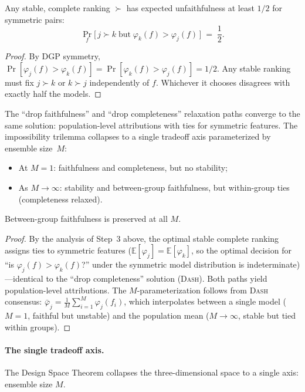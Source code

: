 \documentclass{jmlr}
\newcommand{\E}{\mathbb{E}}
\newcommand{\DASH}{\textsc{Dash}}
\begin{document}
\begin{theorem}
\label{thm:unfaithfulness-bound}
Any stable, complete ranking $\succ$ has expected unfaithfulness at least $1/2$ for symmetric pairs:
\[
    \Pr_f\bigl[\, j \succ k \;\text{but}\; \varphi_k(f) > \varphi_j(f) \,\bigr] \;=\; \frac{1}{2}.
\]
\end{theorem}

\begin{proof}
By DGP symmetry, $\Pr[\varphi_j(f) > \varphi_k(f)] = \Pr[\varphi_k(f) > \varphi_j(f)] = 1/2$. Any stable ranking must fix $j \succ k$ or $k \succ j$ independently of $f$. Whichever it chooses disagrees with exactly half the models.
\end{proof}

\begin{theorem}
\label{thm:path-convergence}
The ``drop faithfulness'' and ``drop completeness'' relaxation paths converge to the same solution: population-level attributions with ties for symmetric features. The impossibility trilemma collapses to a single tradeoff axis parameterized by ensemble size~$M$:
\begin{itemize}
    \item At $M = 1$: faithfulness and completeness, but no stability;
    \item As $M \to \infty$: stability and between-group faithfulness, but within-group ties (completeness relaxed).
\end{itemize}
Between-group faithfulness is preserved at all $M$.
\end{theorem}

\begin{proof}
By the analysis of Step~3 above, the optimal stable complete ranking assigns ties to symmetric features ($\E[\varphi_j] = \E[\varphi_k]$, so the optimal decision for ``is $\varphi_j(f) > \varphi_k(f)$?'' under the symmetric model distribution is indeterminate)---identical to the ``drop completeness'' solution (\DASH{}). Both paths yield population-level attributions. The $M$-parameterization follows from \DASH{} consensus: $\bar\varphi_j = \frac{1}{M}\sum_{i=1}^M \varphi_j(f_i)$, which interpolates between a single model ($M=1$, faithful but unstable) and the population mean ($M \to \infty$, stable but tied within groups).
\end{proof}

\paragraph{The single tradeoff axis.}
The Design Space Theorem collapses the three-dimensional space to a single axis: ensemble size $M$.
\end{document}
